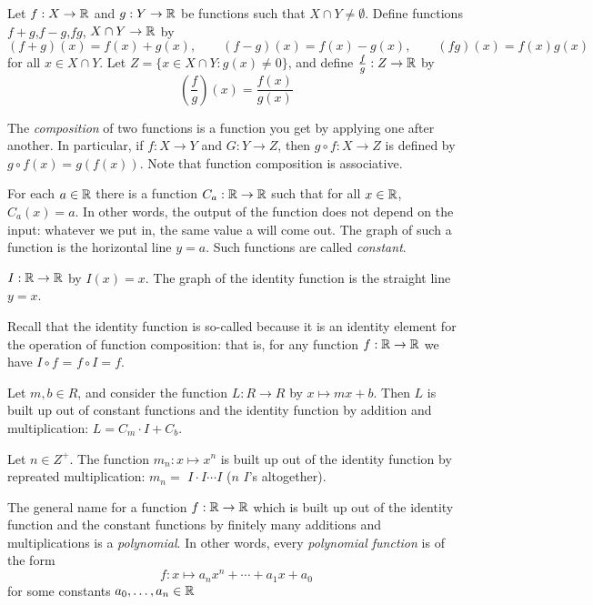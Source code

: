 \begin{defi}
     Let $f:X \rightarrow \mathbb{R}$ and $g:Y \rightarrow \mathbb{R}$ be functions such that
     $X\cap Y \neq \emptyset$. Define functions $f+g$,$f-g$,$fg$, $X\cap Y \rightarrow \mathbb{R}$ by 
     \begin{equation*}
         (f+g)(x)=f(x)+g(x), \qquad (f-g)(x)=f(x)-g(x), \qquad (fg)(x)=f(x)g(x)
     \end{equation*}
     for all $x \in X\cap Y$.
     Let $Z=\{x \in X \cap Y:g(x)\neq 0\}$, and define $\tfrac{f}{g}:Z \rightarrow \mathbb{R}$ by 
     \begin{equation*}
         \left( \dfrac{f}{g}\right)(x) = \dfrac{f(x)}{g(x)}
     \end{equation*}
\end{defi}
\begin{defi}
    The \emph{composition} of two functions is a function you get by applying
    one after another. In particular, if $f: X \rightarrow Y$ and $G:
    Y\rightarrow Z$, then $g\circ f: X \rightarrow Z$ is defined by $g\circ f(x)
    = g(f(x))$. Note that function composition is associative.
  \end{defi}
  \begin{defi}
    For each $a \in \mathbb{R}$ there is a function $C_a : \mathbb{R} \rightarrow \mathbb{R}$ such that
    for all $x \in \mathbb{R}$, $C_a(x) = a$. In other words, the output of the function does
    not depend on the input: whatever we put in, the same value a will come out.
    The graph of such a function is the horizontal line $y = a$. Such functions
    are called \emph{constant}.
  \end{defi}
  \begin{defi}
       $I:\mathbb{R} \rightarrow\mathbb{R}$ by $I(x)=x$. The graph of the identity
       function is the straight line $y = x$.
  \end{defi}
  Recall that the identity function is so-called because it is an identity
element for the operation of function composition: that is, for any function $f :
\mathbb{R} \rightarrow \mathbb{R}$ we have $I \circ f$ = $f \circ I = f$.
\begin{eg}
     Let $m, b \in R$, and consider the function $L : R \rightarrow R$ by $x \mapsto
    mx + b$. Then $L$ is built up out of constant functions and the identity
    function by addition and multiplication: $L = C_m \cdot I + C_b$.
\end{eg}
\begin{eg}
    Let $n \in Z^+$. The function $m_n : x\mapsto x^n$ is built up out of the
    identity function by repreated multiplication: $m_n = $ $I \cdot I \cdots I$
    ($n$ $I$’s altogether).
\end{eg}
\begin{defi}
    The general name for a function $f : \mathbb{R} \rightarrow \mathbb{R}$ which is built up out of the
    identity function and the constant functions by finitely many additions and
    multiplications is a \emph{polynomial}. In other words, every \emph{polynomial function}
    is of the form
    \begin{equation*}
        f:x \mapsto a_nx^n+\cdots +a_1x+a_0
    \end{equation*}
    for some constants $a_0,\ldots,a_n \in \mathbb{R}$ 
\end{defi}
